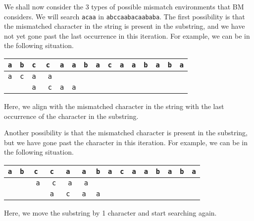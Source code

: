 \documentclass[a4paper, openany]{memoir}
\begin{document}

We shall now consider the 3 types of possible mismatch environments that BM considers. We will search \texttt{acaa} in \texttt{abccaabacaababa}. The first possibility is that the mismatched character in the string is present in the substring, and we have not yet gone past the last occurrence in this iteration. For example, we can be in the following situation.
\begin{table}[H]
    \centering
    \begin{tabular}{ccccccccccccccc}
        \texttt{a} &\texttt{b} & \texttt{c} &\texttt{c} & \texttt{a} & \texttt{a} & \texttt{b} & \texttt{a} & \texttt{c} & \texttt{a} & \texttt{a} & \texttt{b} & \texttt{a} & \texttt{b} & \texttt{a} \\
        \hline
        \texttt{a} & \texttt{c} & \texttt{a} & \texttt{\color{red} a} \\
        & & \texttt{a} & \texttt{\color{cyan} c} & \texttt{a} & \texttt{a} 
    \end{tabular}
\end{table}
\noindent Here, we align with the mismatched character in the string with the last occurrence of the character in the substring. 

Another possibility is that the mismatched character is present in the substring, but we have gone past the character in this iteration. For example, we can be in the following situation.
\begin{table}[H]
    \centering
    \begin{tabular}{ccccccccccccccc}
        \texttt{a} &\texttt{b} & \texttt{c} &\texttt{c} & \texttt{a} & \texttt{a} & \texttt{b} & \texttt{a} & \texttt{c} & \texttt{a} & \texttt{a} & \texttt{b} & \texttt{a} & \texttt{b} & \texttt{a} \\
        \hline
        & & \texttt{\color{red} a} & \texttt{\color{brown} c} & \texttt{\color{brown} a} & \texttt{\color{brown} a} \\
        & & & \texttt{a} & \texttt{c} & \texttt{a} & \texttt{a} 
    \end{tabular}
\end{table}
\noindent Here, we move the substring by 1 character and start searching again. 
\end{document}
